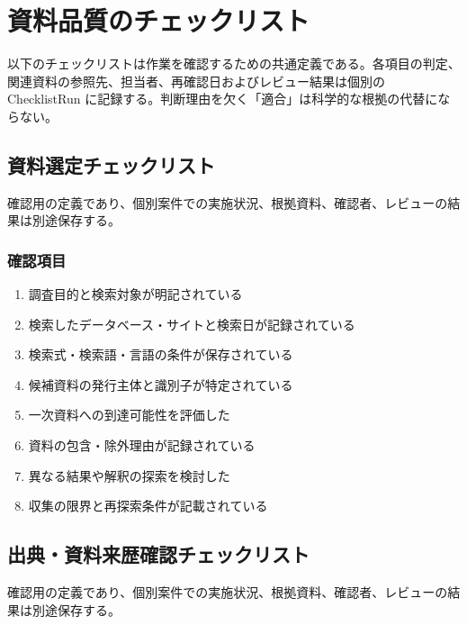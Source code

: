 \documentclass[a4paper,11pt]{article}
\begin{document}
\section{資料品質のチェックリスト}
\par 以下のチェックリストは作業を確認するための共通定義である。各項目の判定、関連資料の参照先、担当者、再確認日およびレビュー結果は個別の ChecklistRun に記録する。判断理由を欠く「適合」は科学的な根拠の代替にならない。\par\medskip
\subsection{資料選定チェックリスト}
\par 確認用の定義であり、個別案件での実施状況、根拠資料、確認者、レビューの結果は別途保存する。\par\medskip
\subsubsection*{確認項目}
\begin{enumerate}[leftmargin=2em,itemsep=0.3em]
\item 調査目的と検索対象が明記されている\par
\item 検索したデータベース・サイトと検索日が記録されている\par
\item 検索式・検索語・言語の条件が保存されている\par
\item 候補資料の発行主体と識別子が特定されている\par
\item 一次資料への到達可能性を評価した\par
\item 資料の包含・除外理由が記録されている\par
\item 異なる結果や解釈の探索を検討した\par
\item 収集の限界と再探索条件が記載されている\par
\end{enumerate}
\subsection{出典・資料来歴確認チェックリスト}
\par 確認用の定義であり、個別案件での実施状況、根拠資料、確認者、レビューの結果は別途保存する。\par\medskip
\end{document}
